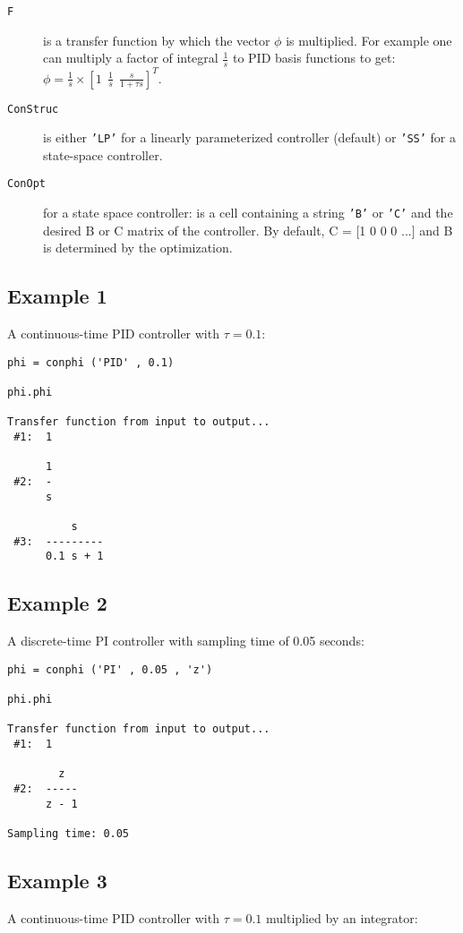\documentclass [12pt , a4paper] {report}
\begin{document}
\begin{description}
\item[\texttt{F}] is a transfer function by which the vector $\phi$ is multiplied. For example one can multiply a factor of integral $\frac{1}{s}$ to PID basis functions to get: $\phi=\frac{1}{s} \times [1\:\: \frac{1}{s} \:\: \frac{s}{1+\tau s}]^T$.

\item[\texttt{ConStruc}] is either \texttt{'LP'} for a linearly parameterized controller (default) or \texttt{'SS'} for a state-space controller.

\item[\texttt{ConOpt}] for a state space controller: is a cell containing a string \texttt{'B'} or \texttt{'C'} and the desired B or C matrix of the controller. By default, C = [1 0 0 0 ...] and B is determined by the optimization.
    

\end{description}


\subsection{Example 1} A continuous-time PID controller with $\tau=0.1$:

\begin{lstlisting}
phi = conphi ('PID' , 0.1) 

phi.phi
 
Transfer function from input to output...
 #1:  1
 
      1
 #2:  -
      s
 
          s
 #3:  ---------
      0.1 s + 1      
\end{lstlisting}

\subsection{Example 2} A discrete-time PI controller with sampling time of 0.05 seconds:

\begin{lstlisting}
phi = conphi ('PI' , 0.05 , 'z') 

phi.phi
 
Transfer function from input to output...
 #1:  1
 
        z
 #2:  -----
      z - 1
 
Sampling time: 0.05
\end{lstlisting}

\subsection{Example 3} A continuous-time PID controller with $\tau=0.1$ multiplied by an integrator:
\end{document}
